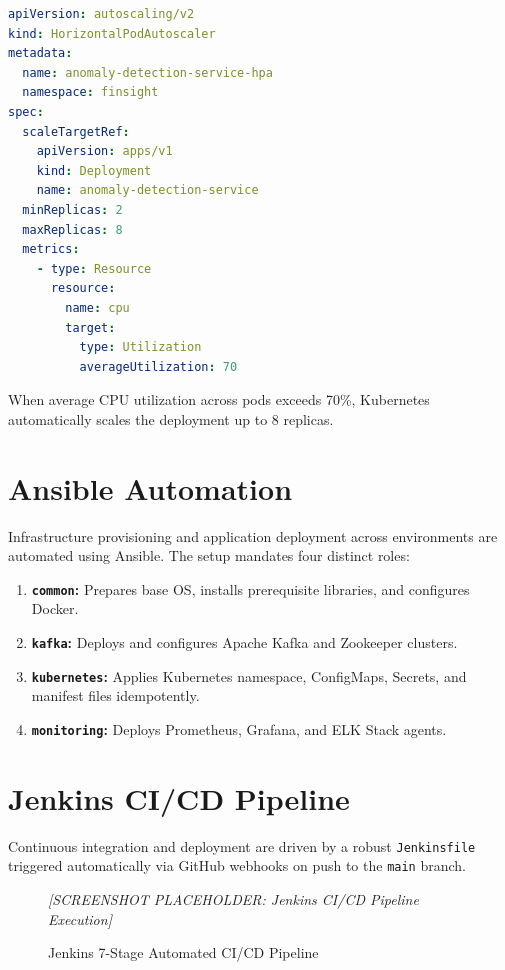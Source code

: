 \documentclass[12pt,a4paper]{report}
\begin{document}
\begin{lstlisting}[language=YAML, caption=HPA Configuration for ML Inference Services]
apiVersion: autoscaling/v2
kind: HorizontalPodAutoscaler
metadata:
  name: anomaly-detection-service-hpa
  namespace: finsight
spec:
  scaleTargetRef:
    apiVersion: apps/v1
    kind: Deployment
    name: anomaly-detection-service
  minReplicas: 2
  maxReplicas: 8
  metrics:
    - type: Resource
      resource:
        name: cpu
        target:
          type: Utilization
          averageUtilization: 70
\end{lstlisting}
When average CPU utilization across pods exceeds 70\%, Kubernetes automatically scales the deployment up to 8 replicas.

\section{Ansible Automation}

Infrastructure provisioning and application deployment across environments are automated using Ansible. The setup mandates four distinct roles:
\begin{enumerate}[leftmargin=1.5em]
  \item \textbf{\texttt{common}:} Prepares base OS, installs prerequisite libraries, and configures Docker.
  \item \textbf{\texttt{kafka}:} Deploys and configures Apache Kafka and Zookeeper clusters.
  \item \textbf{\texttt{kubernetes}:} Applies Kubernetes namespace, ConfigMaps, Secrets, and manifest files idempotently.
  \item \textbf{\texttt{monitoring}:} Deploys Prometheus, Grafana, and ELK Stack agents.
\end{enumerate}

\section{Jenkins CI/CD Pipeline}

Continuous integration and deployment are driven by a robust \texttt{Jenkinsfile} triggered automatically via GitHub webhooks on push to the \texttt{main} branch.

\begin{figure}[H]
  \centering
  \begin{tcolorbox}[enhanced, colback=gray!10, colframe=gray!50, width=0.9\linewidth,
      height=5cm, arc=6pt, valign=center, halign=center]
    \textcolor{gray!70}{\large\textit{[SCREENSHOT PLACEHOLDER: Jenkins CI/CD Pipeline Execution]}}
  \end{tcolorbox}
  \caption{Jenkins 7-Stage Automated CI/CD Pipeline}
\end{figure}
\end{document}
